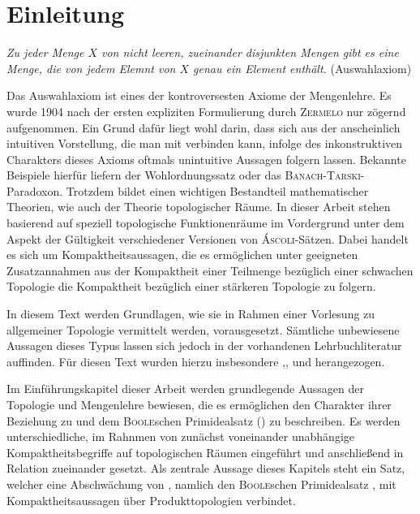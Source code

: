 \chapter*{Einleitung}

\begin{addmargin}[2em]{2em}%
  \textit{Zu jeder Menge $X$ von nicht leeren, zueinander disjunkten Mengen gibt es eine Menge, die von jedem Elemnt von $X$ genau ein Element enthält.} 
  \flushright(Auswahlaxiom)
\end{addmargin}

Das Auswahlaxiom \AC ist eines der kontroversesten Axiome der Mengenlehre.
Es wurde 1904 nach der ersten expliziten Formulierung durch \textsc{Zermelo} nur zögernd aufgenommen.
Ein Grund dafür liegt wohl darin, dass sich aus der anscheinlich intuitiven Vorstellung, die man mit \AC verbinden kann, infolge des inkonstruktiven Charakters dieses Axioms oftmals unintuitive Aussagen folgern lassen.
Bekannte Beispiele hierfür liefern der Wohlordnungssatz oder das \textsc{Banach}-\textsc{Tarski}-Paradoxon.
Trotzdem bildet \AC einen wichtigen Bestandteil mathematischer Theorien, wie auch der Theorie topologischer Räume.
In dieser Arbeit stehen basierend auf \cite{herrlich2006axiom} speziell topologische Funktionenräume im Vordergrund unter dem Aspekt der Gültigkeit verschiedener Versionen von \textsc{Áscoli}-Sätzen.
Dabei handelt es sich um Kompaktheitsaussagen, die es ermöglichen unter geeigneten Zusatzannahmen aus der Kompaktheit einer Teilmenge bezüglich einer schwachen Topologie die Kompaktheit bezüglich einer stärkeren Topologie zu folgern.

In diesem Text werden Grundlagen, wie sie in Rahmen einer Vorlesung zu allgemeiner Topologie vermittelt werden, vorausgesetzt.
Sämtliche unbewiesene Aussagen dieses Typus lassen sich jedoch in der vorhandenen Lehrbuchliteratur auffinden.
Für diesen Text wurden hierzu insbesondere \cite{bartsch2015allgemeine},\cite{ebbinghaus2003einfuhrung},\cite{preuss1972topologische} und \cite{kelley1975general} herangezogen.

Im Einführungskapitel dieser Arbeit werden grundlegende Aussagen der Topologie und Mengenlehre bewiesen, die es ermöglichen den Charakter ihrer Beziehung zu \AC und dem \textsc{Boole}schen Primidealsatz (\PIT) zu beschreiben. 
Es werden unterschiedliche, im Rahnmen von \ZF zunächst voneinander unabhängige Kompaktheitsbegriffe auf topologischen Räumen eingeführt und anschließend in Relation zueinander gesetzt.
Als zentrale Aussage dieses Kapitels steht ein Satz, welcher eine Abschwächung von \AC, namlich den \textsc{Boole}schen Primidealsatz \PIT, mit Kompaktheitsaussagen über Produkttopologien verbindet.

